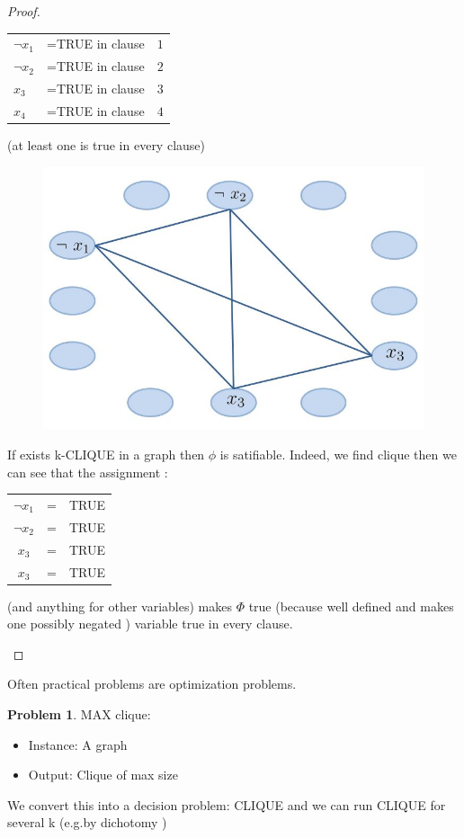 \documentclass[11pt]{report}
\theoremstyle{definition}
\newtheorem{definition}{Problem}
\theoremstyle{remark}
\begin{document}
\begin{proof}
\begin{itemize}
\begin{center}
\begin{tabular}{lll}
$\neg x_1$ &=TRUE in clause & $1$ \\$\neg x_2$ &=TRUE in clause & $2$ \\ $ x_3$ &=TRUE in clause & $3$ \\ $x_4$ &=TRUE in clause & $4$
\end{tabular}
\end{center}

(at least one is true in every clause)

\begin{figure}[h!!]
\centering
\includegraphics[scale=0.45]{fig_4.jpg}
\end{figure}


If exists k-CLIQUE in a graph then $\phi$ is satifiable.
 Indeed, we find clique then we can see that the assignment : \\
 
 \begin{center}
\begin{tabular}{ccc}
$ \neg x_1$ & =& TRUE \\
$\neg x_2$ & =& TRUE \\
 $x_3$ & =& TRUE \\
 $x_3$ & =& TRUE \\
\end{tabular}
\end{center}
(and anything for other variables) makes $\Phi$ true (because well defined and makes one possibly negated ) variable true in every clause.\\
\end{itemize}
\end{proof}

Often practical problems are optimization problems.\\

\begin{definition}
MAX clique:
\begin{itemize}
\item Instance: A graph
\item Output:  Clique of max size
\end{itemize}

We convert this into a decision problem: CLIQUE and we can run CLIQUE for several k (e.g.by dichotomy )
\end{definition}

  
\end{document}
